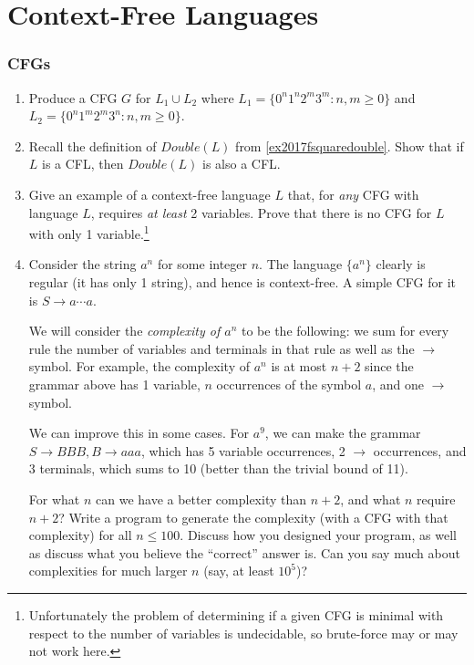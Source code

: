 \part{Context-Free Languages}

\section{CFGs}

\begin{enumerate}[resume]

\item \label{summer_2017_cfg}  Produce a CFG $G$ for $L_1 \cup L_2$ where $L_1 = \{0^n 1^n 2^m 3^m : n,m \ge 0 \}$ and $L_2 = \{0^n 1^m 2^m 3^n : n, m \ge 0 \}$.

\item {} Recall the definition of $Double(L)$ from \cref{ex2017fsquaredouble}. Show that if $L$ is a CFL, then $Double(L)$ is also a CFL.

\item {} Give an example of a context-free language $L$ that, for \emph{any} CFG with language $L$, requires \emph{at least} 2 variables. 
Prove that there is no CFG for $L$ with only 1 variable.\footnote{Unfortunately the problem of determining if a given CFG is minimal with respect to the number of variables is undecidable, so brute-force may or may not work here.}

\item {} Consider the string $a^n$ for some integer $n$. The language $\{a^n\}$ clearly is regular (it has only 1 string), and hence is context-free. A simple CFG for it is $S \to a\cdots a$. 

We will consider the \emph{complexity of $a^n$} to be the following: we sum for every rule the number of variables and terminals in that rule as well as the $\to$ symbol. For example, the complexity of $a^n$ is at most $n+2$ since the grammar above has 1 variable, $n$ occurrences of the symbol $a$, and one $\to$ symbol.

We can improve this in some cases. For $a^9$, we can make the grammar $S \to BBB, B \to aaa$, which has 5 variable occurrences, 2 $\to$ occurrences, and 3 terminals, which sums to 10 (better than the trivial bound of 11).

For what $n$ can we have a better complexity than $n+2$, and what $n$ require $n+2$?
Write a program to generate the complexity (with a CFG with that complexity) for all $n \le 100$. 
Discuss how you designed your program, as well as discuss what you believe the ``correct'' answer is. 
Can you say much about complexities for much larger $n$ (say, at least $10^5$)?

\end{enumerate}


